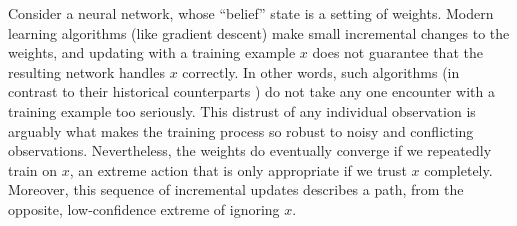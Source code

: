 Consider a neural network, whose ``belief'' state is a setting of weights.
Modern learning algorithms (like gradient descent) make small incremental changes to the weights, and updating with a training example $x$ does not guarantee that the resulting network handles $x$ correctly. 
In other words, such algorithms 
(in contrast to their historical counterparts \parencite{conjunctions}) 
do not take any one encounter with a training example too seriously.
This distrust of any individual observation is arguably what makes the training process so robust to noisy and conflicting observations.
Nevertheless, the weights do eventually converge if we repeatedly train on $x$, 
an extreme action that is only appropriate if we trust $x$ completely.
Moreover, this sequence of incremental updates describes a path, from the opposite, low-confidence extreme of ignoring $x$.%
